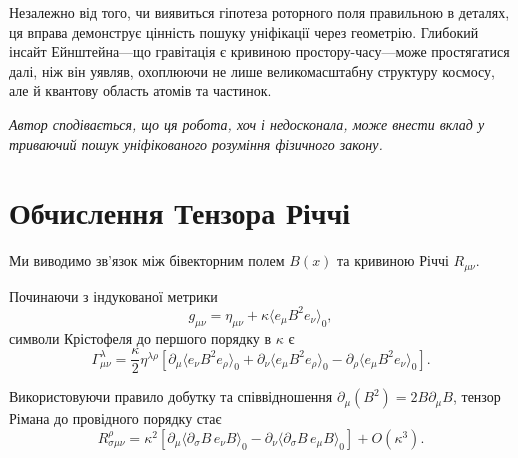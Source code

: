\documentclass[11pt,a4paper]{article}
\numberwithin{equation}{section}
\theoremstyle{plain}
\theoremstyle{definition}
\theoremstyle{remark}
\newif\ifack
\begin{document}
Незалежно від того, чи виявиться гіпотеза роторного поля правильною в деталях, ця вправа демонструє цінність пошуку уніфікації через геометрію. Глибокий інсайт Ейнштейна---що гравітація є кривиною простору-часу---може простягатися далі, ніж він уявляв, охоплюючи не лише великомасштабну структуру космосу, але й квантову область атомів та частинок.

\medskip
\noindent\textit{Автор сподівається, що ця робота, хоч і недосконала, може внести вклад у триваючий пошук уніфікованого розуміння фізичного закону.}

\ifack
\section*{Подяки}
Автор вдячний піонерській роботі Девіда Хестенса та колег у розробці геометричної алгебри як мови для фізики. Обговорення з Ентоні Ласенбі та Крісом Дораном з теорії калібрувальної гравітації були неоціненними. Подяка належить колабораціям LIGO та Virgo за надання даних гравітаційних хвиль у публічний доступ. Ця робота проводилась незалежно без зовнішнього фінансування.
\fi

\appendix
\section{Обчислення Тензора Річчі}
\label{app:ricci}

Ми виводимо зв'язок між бівекторним полем $B(x)$ та кривиною Річчі $R_{\mu\nu}$.

Починаючи з індукованої метрики
\begin{equation}
g_{\mu\nu} = \eta_{\mu\nu} + \kappa \langle e_\mu B^2 e_\nu \rangle_0,
\end{equation}
символи Крістофеля до першого порядку в $\kappa$ є
\begin{equation}
\Gamma^\lambda_{\mu\nu} = \frac{\kappa}{2} \eta^{\lambda\rho} \left[\partial_\mu \langle e_\nu B^2 e_\rho \rangle_0 + \partial_\nu \langle e_\mu B^2 e_\rho \rangle_0 - \partial_\rho \langle e_\mu B^2 e_\nu \rangle_0\right].
\end{equation}

Використовуючи правило добутку та співвідношення $\partial_\mu (B^2) = 2 B \partial_\mu B$, тензор Рімана до провідного порядку стає
\begin{equation}
R^\rho_{\sigma\mu\nu} = \kappa^2 \left[\partial_\mu \langle \partial_\sigma B \, e_\nu B \rangle_0 - \partial_\nu \langle \partial_\sigma B \, e_\mu B \rangle_0\right] + O(\kappa^3).
\end{equation}
\end{document}
